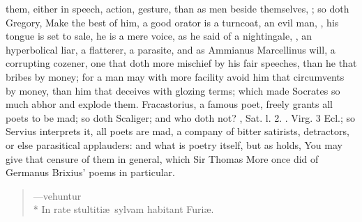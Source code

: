 them, either in speech, action, gesture, than as men beside themselves,
; so doth Gregory,  Make the best of him, a good orator is a turncoat, an
evil man, , his tongue is set to sale, he is a
mere voice, as he said of a nightingale, , an
hyperbolical liar, a flatterer, a parasite, and as  Ammianus
Marcellinus will, a corrupting cozener, one that doth more mischief by
his fair speeches, than he that bribes by money; for a man may with
more facility avoid him that circumvents by money, than him that
deceives with glozing terms; which made Socrates so much abhor and
explode them. Fracastorius, a famous poet, freely grants all poets
to be mad; so doth Scaliger; and who doth not? , \Horace{} Sat.  l. 2.
. Virg. 3 Ecl.; so Servius
interprets it, all poets are mad, a company of bitter satirists,
detractors, or else parasitical applauders: and what is poetry itself,
but as \Austin{} holds,  You
may give that censure of them in general, which Sir Thomas More once
did of Germanus Brixius' poems in particular.
%
\begin{verse}
---\textlatin{vehuntur}\\*
\textlatin{In rate stultiti\ae{}\ sylvam habitant Furi\ae{}.}
\end{verse}

